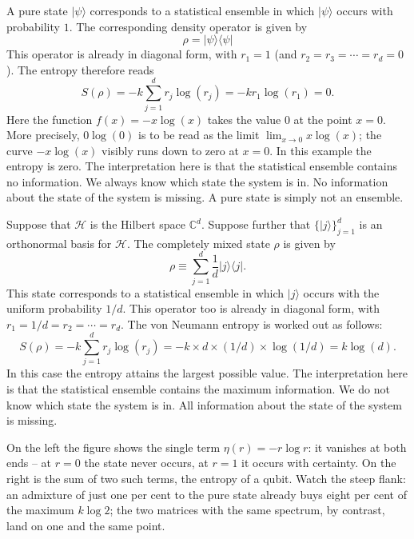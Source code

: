 \begin{example}
  A pure state $|\psi\rangle$ corresponds to a statistical ensemble in which $|\psi\rangle$ occurs with probability $1$. The corresponding density operator is given by
  \begin{equation}
    \rho = |\psi\rangle\langle \psi|
  \end{equation}
  This operator is already in diagonal form, with $r_1 = 1$ (and $r_2 = r_3 = \cdots = r_d =0$). The entropy therefore reads
  \begin{equation}
    S(\rho) = -k\sum_{j=1}^d r_j\log(r_j) = -k r_1\log(r_1) = 0.
  \end{equation}
  Here the function $f(x) = -x\log(x)$ takes the value $0$ at the point $x=0$. More precisely, $0\log(0)$ is to be read as the limit $\lim_{x\to 0} x\log(x)$; the curve $-x\log(x)$ visibly runs down to zero at $x=0$. In this example the entropy is zero. The interpretation here is that the statistical ensemble contains no information. We always know which state the system is in. No information about the state of the system is missing. A pure state is simply not an ensemble.
\end{example}

\begin{example}
  Suppose that $\mathcal{H}$ is the Hilbert space $\mathbb{C}^d$. Suppose further that $\{|j\rangle \}_{j=1}^d$ is an orthonormal basis for $\mathcal{H}$. The completely mixed state $\rho$ is given by
  \begin{equation}
    \rho \equiv \sum_{j=1}^d \frac{1}{d} |j\rangle\langle j|.
  \end{equation}
  This state corresponds to a statistical ensemble in which $|j\rangle$ occurs with the uniform probability $1/d$. This operator too is already in diagonal form, with $r_1 = 1/d = r_2 = \cdots = r_d$. The von Neumann entropy is worked out as follows:
  \begin{equation}
    S(\rho) = -k\sum_{j=1}^d r_j\log(r_j) = -k \times d \times  (1/d) \times \log(1/d) = k \log(d).
  \end{equation}
  In this case the entropy attains the largest possible value. The interpretation here is that the statistical ensemble contains the maximum information. We do not know which state the system is in. All information about the state of the system is missing.
\end{example}



On the left the figure shows the single term $\eta(r)=-r\log r$: it vanishes
at both ends -- at $r=0$ the state never occurs, at $r=1$ it occurs with certainty.
On the right is the sum of two such terms, the entropy of a qubit. Watch
the steep flank: an admixture of just one per cent to the pure state already buys eight
per cent of the maximum $k\log 2$; the two matrices with the same spectrum, by contrast,
land on one and the same point.

